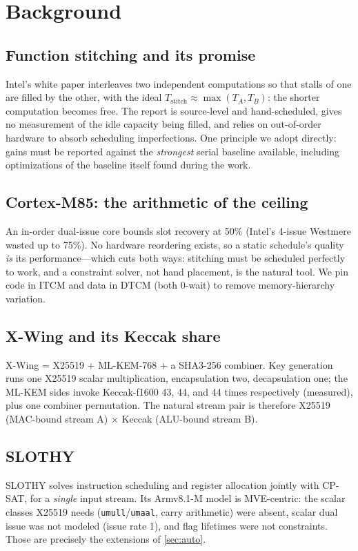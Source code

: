 \documentclass[11pt,a4paper]{article}
\newcommand{\xwing}{X-Wing}\newcommand{\slothy}{SLOTHY}\newcommand{\keccak}{Keccak-f1600}
\begin{document}
\section{Background}\label{sec:background}

\subsection{Function stitching and its promise}
Intel's white paper \cite{Intel10} interleaves two independent computations so
that stalls of one are filled by the other, with the ideal
$T_{\text{stitch}} \approx \max(T_A, T_B)$: the shorter computation becomes
free. The report is source-level and hand-scheduled, gives no measurement of the
idle capacity being filled, and relies on out-of-order hardware to absorb
scheduling imperfections. One principle we adopt directly: gains must be
reported against the \emph{strongest} serial baseline available, including
optimizations of the baseline itself found during the work.

\subsection{Cortex-M85: the arithmetic of the ceiling}
An in-order dual-issue core bounds slot recovery at 50\% (Intel's 4-issue
Westmere wasted up to 75\%). No hardware reordering exists, so a static
schedule's quality \emph{is} its performance---which cuts both ways: stitching
must be scheduled perfectly to work, and a constraint solver, not hand
placement, is the natural tool. We pin code in ITCM and data in DTCM (both
0-wait) to remove memory-hierarchy variation.

\subsection{\xwing{} and its Keccak share}
\xwing{} \cite{XWing24} = X25519 + ML-KEM-768 + a SHA3-256 combiner. Key
generation runs one X25519 scalar multiplication, encapsulation two,
decapsulation one; the ML-KEM sides invoke \keccak{} 43, 44, and 44 times
respectively (measured), plus one combiner permutation. The natural stream pair
is therefore X25519 (MAC-bound stream A) $\times$ Keccak (ALU-bound stream B).

\subsection{\slothy{}}
\slothy{} \cite{Slothy22,SlothyM7_25} solves instruction scheduling and register
allocation jointly with CP-SAT, for a \emph{single} input stream. Its
Armv8.1-M model is MVE-centric: the scalar classes X25519 needs
(\texttt{umull}/\texttt{umaal}, carry arithmetic) were absent, scalar dual issue
was not modeled (issue rate 1), and flag lifetimes were not constraints. Those
are precisely the extensions of \cref{sec:auto}.
\end{document}
